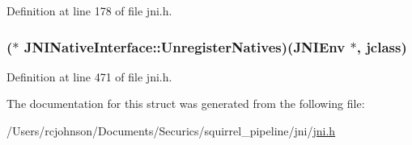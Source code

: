 Definition at line 178 of file jni.\-h.

\hypertarget{struct_j_n_i_native_interface_afe4a0d70486883a2721dadc669ed03fa}{
\subsubsection[{Unregister\-Natives}]{($\ast$ J\-N\-I\-Native\-Interface\-::\-Unregister\-Natives)({\bf J\-N\-I\-Env} $\ast$, {\bf jclass})}}\label{struct_j_n_i_native_interface_afe4a0d70486883a2721dadc669ed03fa}


Definition at line 471 of file jni.\-h.



The documentation for this struct was generated from the following file\-:\begin{DoxyCompactItemize}
\item 
/\-Users/rcjohnson/\-Documents/\-Securics/squirrel\-\_\-pipeline/jni/\hyperlink{jni_8h}{jni.\-h}\end{DoxyCompactItemize}
